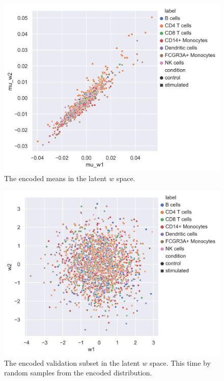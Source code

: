 \documentclass[11pt, a4paper]{report}
\theoremstyle{plain}
\theoremstyle{definition}
\theoremstyle{remark}
\begin{document}
\begin{figure}[h]
\centering
\includegraphics[width=1.1\textwidth]{images/Kang_val_mu_w_labels.png}
\caption{
The encoded means in the latent $w$ space.
}
\label{fig:Kang_val_mu_w_labels}
\end{figure}

\begin{figure}[h]
\centering
\includegraphics[width=1.1\textwidth]{images/Kang_val_w_labels.png}
\caption{
The encoded validation subset in the latent $w$ space. This time by random
samples from the encoded distribution.
}
\label{fig:Kang_val_w_labels}
\end{figure}
\end{document}
